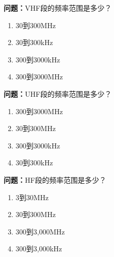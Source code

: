 \textbf{问题：}VHF段的频率范围是多少？
\begin{enumerate}[label=\Alph*), leftmargin=1cm]
	\item 30到300MHz
	\item 30到300kHz
	\item 300到3000kHz
	\item 300到3000MHz
\end{enumerate}

\textbf{问题：}UHF段的频率范围是多少？
\begin{enumerate}[label=\Alph*), leftmargin=1cm]
	\item 300到3000MHz
	\item 30到300MHz
	\item 300到3000kHz
	\item 30到300kHz
\end{enumerate}

\textbf{问题：}HF段的频率范围是多少？
\begin{enumerate}[label=\Alph*), leftmargin=1cm]
	\item 3到30MHz
	\item 30到300MHz
	\item 300到3,000MHz
	\item 300到3,000kHz
\end{enumerate}




